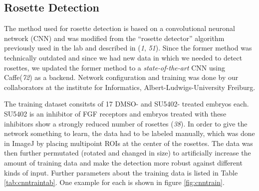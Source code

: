 \documentclass[11pt,singlespacinge,twoside]{reedthesis} %
\theoremstyle{definition}
\theoremstyle{definition}
\theoremstyle{definition}
\theoremstyle{remark}
\begin{document}
\hypertarget{CNN}{%
\subsection{Rosette Detection}\label{CNN}}

The method used for rosette detection is based on a convolutional neuronal network (CNN) and was modified from the ``rosette detector'' algorithm previously used in the lab and described in (\emph{1}, \emph{51}). Since the former method was technically outdated and since we had new data in which we needed to detect rosettes, we updated the former method to a \emph{state-of-the-art} CNN using Caffe(\emph{72}) as a backend. Network configuration and training was done by our collaborators at the institute for Informatics, Albert-Ludwigs-University Freiburg.

The training dataset consitsts of 17 DMSO- and SU5402- treated embryos each. SU5402 is an inhibitor of FGF receptors and embryos treated with these inhibitors show a strongly reduced number of rosettes (\emph{38}). In order to give the network something to learn, the data had to be labeled manually, which was done in ImageJ by placing multipoint ROIs at the center of the rosettes. The data was then further permutated (rotated and changed in size) to artificially increase the amount of training data and make the detection more robust against different kinds of input. Further parameters about the training data is listed in Table \ref{tab:cnntraintab}. One example for each is shown in figure \ref{fig:cnntrain}.
\end{document}
